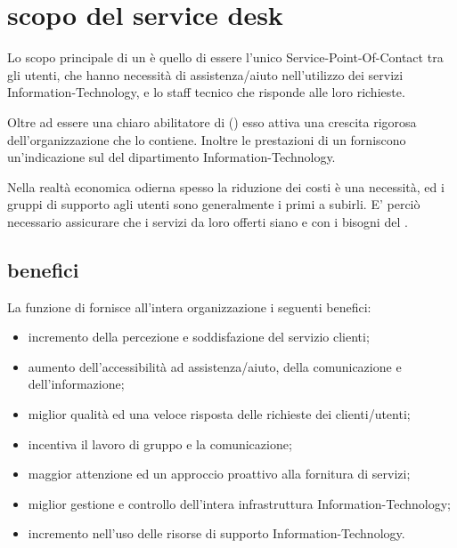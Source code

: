 %
%
\section[Scopo del Service Desk]{scopo del service desk}
\label{sd-scope}
Lo scopo principale di un  è quello di essere l'unico \ac{Service-Point-Of-Contact} tra gli utenti, che hanno necessità di assistenza/aiuto nell'utilizzo dei servizi \acs{Information-Technology}, e lo staff tecnico che risponde alle loro richieste.

Oltre ad essere una chiaro abilitatore di  () esso attiva una crescita rigorosa dell'organizzazione che lo contiene. Inoltre le prestazioni di un  forniscono un'indicazione sul  del dipartimento \acs{Information-Technology}.

Nella realtà economica odierna spesso la riduzione dei costi è una necessità, ed i gruppi di supporto agli utenti sono generalmente i primi a subirli. E' perciò necessario assicurare che i servizi da loro offerti siano  e  con i bisogni del .

\subsection[Benefici]{benefici}
\label{sd-benefits}
La funzione di  fornisce all'intera organizzazione i seguenti benefici:

\begin{itemize}
\item{incremento della percezione e soddisfazione del servizio clienti;}
\item{aumento dell'accessibilità ad assistenza/aiuto, della comunicazione e dell'informazione;}
\item{miglior qualità ed una veloce risposta delle richieste dei clienti/utenti;}
\item{incentiva il lavoro di gruppo e la comunicazione;}
\item{maggior attenzione ed un approccio proattivo alla fornitura di servizi;}
\item{miglior gestione e controllo dell'intera infrastruttura \acs{Information-Technology};}
\item{incremento nell'uso delle risorse di supporto \acs{Information-Technology}.}
\end{itemize}

